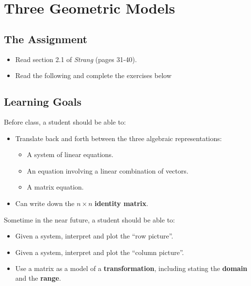 \documentclass[10pt,]{book}
\newcommand{\terminology}[1]{\textbf{#1}}
\theoremstyle{plain}
\numberwithin{equation}{section}
\begin{document}
\section[Three Geometric Models]{Three Geometric Models}\label{three-pictures}
\typeout{************************************************}
\typeout{************************************************}
\subsection[The Assignment]{The Assignment}\label{subsection-19}
\begin{itemize}
\item{}
        Read section 2.1 of \emph{Strang} (pages 31-40).
      \item{}
        Read the following and complete the exercises below
      \end{itemize}
\typeout{************************************************}
\typeout{************************************************}
\subsection[Learning Goals]{Learning Goals}\label{subsection-20}

      Before class, a student should be able to:
\begin{itemize}
\item{}Translate back and forth between the three algebraic representations:
        \begin{itemize}
\item{}
            A system of linear equations.
          \item{}
            An equation involving a linear combination of vectors.
          \item{}
            A matrix equation.
          \end{itemize}

      \item{}
        Can write down the \(n \times n\) \terminology{identity matrix}.
      \end{itemize}
\par

      Sometime in the near future, a student should be able to:
\begin{itemize}
\item{}Given a system, interpret and plot the ``row picture''.\item{}Given a system, interpret and plot the ``column picture''.\item{}Use a matrix as a model of a \terminology{transformation}, including stating
        the \terminology{domain} and the \terminology{range}.\end{itemize}
\typeout{************************************************}
\typeout{************************************************}
\end{document}
